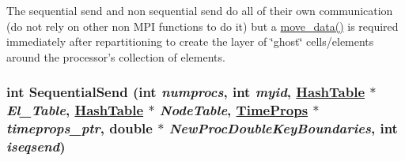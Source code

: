 The sequential send and non sequential send do all of their own communication (do not rely on other non MPI functions to do it) but a \hyperlink{move__data_8C_a0}{move\_\-data()} is required immediately after repartitioning to create the layer of \char`\"{}ghost\char`\"{} cells/elements around the processor's collection of elements. \hypertarget{repartition__BSFC_8C_a10}{
\subsubsection[SequentialSend]{\setlength{\rightskip}{0pt plus 5cm}int Sequential\-Send (int {\em numprocs}, int {\em myid}, \hyperlink{classHashTable}{Hash\-Table} $\ast$ {\em El\_\-Table}, \hyperlink{classHashTable}{Hash\-Table} $\ast$ {\em Node\-Table}, \hyperlink{structTimeProps}{Time\-Props} $\ast$ {\em timeprops\_\-ptr}, double $\ast$ {\em New\-Proc\-Double\-Key\-Boundaries}, int {\em iseqsend})}}
\label{repartition__BSFC_8C_a10}


